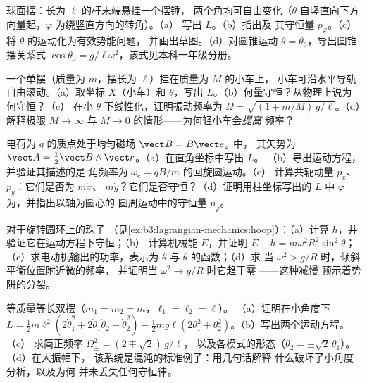 \begin{exercise}[$\star\star$]\label{exo:b3:lagrangian-mechanics:6}
球面摆：长为 $\ell$ 的杆末端悬挂一个摆锤，
两个角均可自由变化（$\theta$ 自竖直向下方向量起，$\varphi$ 为绕竖直方向的转角）。（a）
写出 $L$。（b）指出及
其守恒量 $p_\varphi$。（c）将 $\theta$ 的运动化为有效势能问题，
并画出草图。（d）对圆锥运动 $\theta =
\theta_0$，导出圆锥摆关系式 $\cos\theta_0 =
g/\ell\omega^2$，该式见本科一年级分册。
\end{exercise}

\begin{exercise}[$\star\star$]\label{exo:b3:lagrangian-mechanics:7}
一个单摆（质量为 $m$，摆长为 $\ell$）挂在质量为 $M$ 的小车上，
小车可沿水平导轨自由滚动。（a）取坐标 $X$（小车）和
$\theta$，写出 $L$。（b）何量守恒？从物理上说为何守恒？（c）
在小 $\theta$ 下线性化，证明振动频率为
$\Omega = \sqrt{(1 + m/M)\,g/\ell}$。（d）解释极限 $M \to
\infty$ 与 $M \to 0$ 的情形——为何轻小车会\emph{提高}
频率？
\end{exercise}

\begin{exercise}[$\star\star$]\label{exo:b3:lagrangian-mechanics:8}
电荷为 $q$ 的质点处于均匀磁场 $\vect B = B\vect e_z$ 中，
其矢势为 $\vect A = \tfrac12\vect B\wedge\vect r$。（a）在直角坐标中写出 $L$。
（b）导出运动方程，并验证其描述的是
角频率为 $\omega_{\text{c}} = qB/m$ 的回旋圆运动。（c）
计算共轭动量 $p_x$、$p_y$：它们是否为 $m\dot x$、
$m\dot y$？它们是否守恒？（d）证明用柱坐标写出的 $L$
中 $\varphi$ 为，并指出以轴为圆心的
圆周运动中的守恒量 $p_\varphi$。
\end{exercise}

\begin{exercise}[$\star\star$]\label{exo:b3:lagrangian-mechanics:9}
对于旋转圆环上的珠子
（见\cref{ex:b3:lagrangian-mechanics:hoop}）：（a）计算
$h$，并验证它在运动方程下守恒；（b）
计算机械能 $E$，并证明 $E - h =
m\omega^2R^2\sin^2\theta$；（c）求电动机输出的功率，表示为
$\theta$ 与 $\dot\theta$ 的函数；（d）求
当 $\omega^2 > g/R$ 时，倾斜平衡位置附近微的频率，
并证明当 $\omega^2 \to g/R$ 时它趋于零 ——这种减慢
预示着势阱的分裂。
\end{exercise}

\begin{exercise}[$\star\star\star$]\label{exo:b3:lagrangian-mechanics:10}
等质量等长双摆（$m_1 = m_2 = m$，$\ell_1 = \ell_2 = \ell$）。
（a）证明在小角度下 $L = \tfrac12 m\ell^2(2\dot\theta_1^2 +
2\dot\theta_1\dot\theta_2 + \dot\theta_2^2) - \tfrac12 mg\ell(2
\theta_1^2 + \theta_2^2)$。（b）写出两个运动方程。（c）
求简正频率 $\Omega_\pm^2 = (2 \mp \sqrt2)\,g/\ell$，
以及各模式的形态（$\theta_2 = \pm\sqrt2\,\theta_1$）。（d）在大振幅下，
该系统是混沌的标准例子：用几句话解释
什么破坏了小角度分析，以及为何
并未丢失任何守恒律。
\end{exercise}

